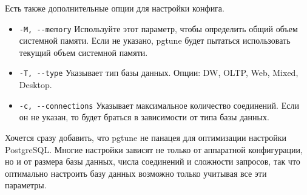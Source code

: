 Есть также дополнительные опции для настройки конфига.
\begin{itemize}
\item
\lstinline!-M, --memory!
Используйте этот параметр, чтобы определить общий объем системной памяти.
Если не указано, pgtune будет пытаться использовать текущий объем системной памяти.

\item
\lstinline!-T, --type!
Указывает тип базы данных. Опции: DW,  OLTP,  Web, Mixed, Desktop.

\item
\lstinline!-c, --connections!
Указывает максимальное количество соединений. Если он не указан, то будет браться в зависимости от типа базы данных.

\end{itemize}

Хочется сразу добавить, что pgtune не панацея для оптимизации настройки PostgreSQL. Многие настройки зависят не только от
аппаратной конфигурации, но и от размера базы данных, числа соединений и сложности запросов, так что оптимально настроить базу данных
возможно только учитывая все эти параметры.
